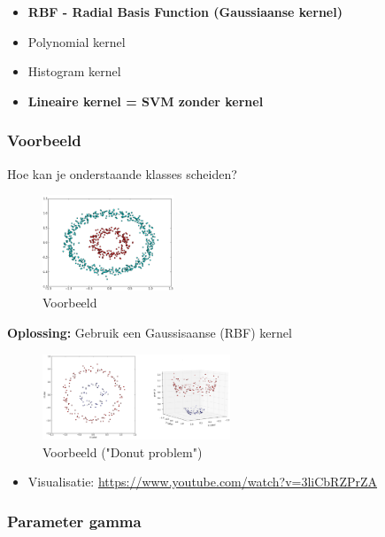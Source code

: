\documentclass{article}
\begin{document}
\begin{itemize}
    \item \textbf{RBF - Radial Basis Function (Gaussiaanse kernel)}
    \item Polynomial kernel
    \item Histogram kernel
    \item \textbf{Lineaire kernel = SVM zonder kernel}
\end{itemize}

\subsubsection{Voorbeeld}

Hoe kan je onderstaande klasses scheiden?

\begin{figure}[H]
    \centering
    \includegraphics[width=0.35\textwidth]{svm-kernels.png}
    \caption{Voorbeeld}
\end{figure}

\textbf{Oplossing:} Gebruik een Gaussisaanse (RBF) kernel

\begin{figure}[H]
    \centering
    \includegraphics[width=0.5\textwidth]{svm-kernels2.png}
    \caption{Voorbeeld ("Donut problem")}
\end{figure}

\begin{itemize}
    \item Visualisatie: \url{https://www.youtube.com/watch?v=3liCbRZPrZA}
\end{itemize}

\subsubsection{Parameter gamma}
\end{document}
